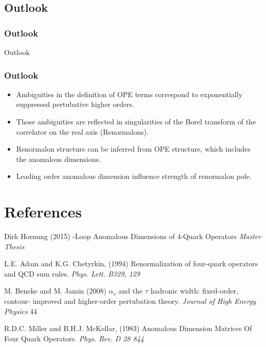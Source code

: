 \documentclass{beamer}
\begin{document}
\subsection{Outlook}
\begin{frame}
\frametitle{Outlook}
\huge\centering
Outlook
\end{frame}

\begin{frame}
\frametitle{Outlook}
\begin{itemize}
\item Ambiguities in the definition of OPE terms correspond to exponentially suppressed pertubative higher orders.
\item Those ambiguities are reflected in singularities of the Borel transform of the correlator on the real axis (Renormalons).
\item Renormalon structure can be inferred from OPE structure, which includes the anomalous dimensions.
\item Leading order anomalous dimension influence strength of renormalon pole.
\end{itemize}
\end{frame}

\section{References}

\begin{frame}
\footnotesize{
\begin{thebibliography}{99} %
 Dirk Hornung (2015)
-Loop Anomalous Dimensions of 4-Quark Operators
\newblock \emph{Master Thesis} 
\end{thebibliography}
}
\footnotesize{
\begin{thebibliography}{99} %
 L.E. Adam and K.G. Chetyrkin, (1994)
\newblock Renormalization of four-quark operators and QCD sum rules.
\newblock \emph{Phys. Lett. B329, 129} 
\end{thebibliography}
}
\footnotesize{
\begin{thebibliography}{99} %
 M. Beneke and M. Jamin (2008)
\newblock $\alpha_s$ and the $\tau$ hadronic width: fixed-order, contour- improved and higher-order pertubation theory. 
\newblock \emph{Journal of High Energy Physics} 44
\end{thebibliography}
}
\footnotesize{
\begin{thebibliography}{99} %
 R.D.C. Miller and B.H.J. McKellar, (1983)
\newblock Anomalous Dimension Matrices Of Four Quark Operators.
\newblock \emph{Phys. Rev. D 28 844} 
\end{thebibliography}
}
\end{frame}
\end{document}
